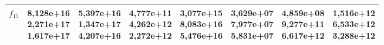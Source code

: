 \begin{table}[t]
\begin{small}
\begin{tabular}{|c|c|c|c|c|c|c|c|}
        $f_{15}$ & \makecell{8,128e+16 \\ 2,271e+17 \\ 1,617e+17} & \makecell{5,397e+16 \\ 1,347e+17 \\ 4,207e+16} & \makecell{4,777e+11 \\ 4,262e+12 \\ 2,272e+12} & \makecell{3,077e+15 \\ 8,083e+16 \\ 5,476e+16} & \makecell{\textbf{3,629e+07} \\ \textbf{7,977e+07} \\ 5,831e+07} & \makecell{4,859e+08 \\ 9,277e+11 \\ 6,617e+12} & \makecell{1,516e+12 \\ 6,533e+12 \\ 3,288e+12} \\\hline
    \end{tabular}
\end{small}
\end{table}

